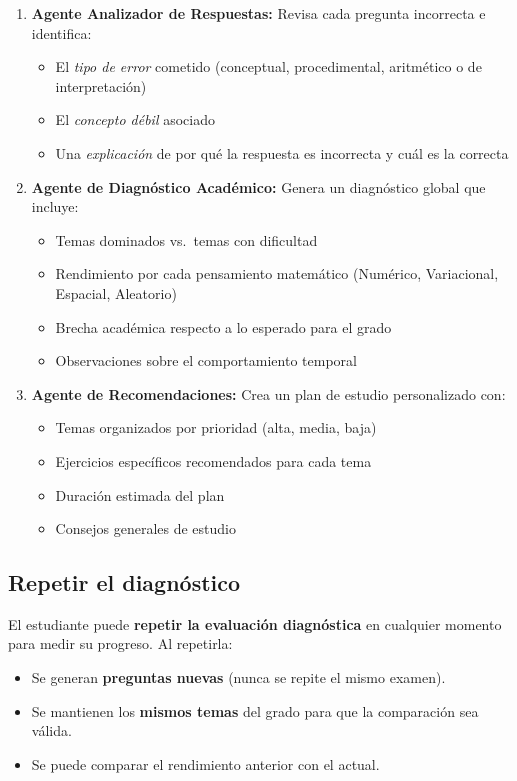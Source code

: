 \documentclass[12pt, a4paper]{article}
\begin{document}
\begin{enumerate}[leftmargin=*, itemsep=8pt]
    \item \textbf{\textcolor{ytOrange}{Agente Analizador de Respuestas:}} Revisa cada pregunta incorrecta e identifica:
    \begin{itemize}
        \item El \textit{tipo de error} cometido (conceptual, procedimental, aritmético o de interpretación)
        \item El \textit{concepto débil} asociado
        \item Una \textit{explicación} de por qué la respuesta es incorrecta y cuál es la correcta
    \end{itemize}
    
    \item \textbf{\textcolor{ytBlue}{Agente de Diagnóstico Académico:}} Genera un diagnóstico global que incluye:
    \begin{itemize}
        \item Temas dominados vs.\ temas con dificultad
        \item Rendimiento por cada pensamiento matemático (Numérico, Variacional, Espacial, Aleatorio)
        \item Brecha académica respecto a lo esperado para el grado
        \item Observaciones sobre el comportamiento temporal
    \end{itemize}
    
    \item \textbf{\textcolor{ytGreen}{Agente de Recomendaciones:}} Crea un plan de estudio personalizado con:
    \begin{itemize}
        \item Temas organizados por prioridad (alta, media, baja)
        \item Ejercicios específicos recomendados para cada tema
        \item Duración estimada del plan
        \item Consejos generales de estudio
    \end{itemize}
\end{enumerate}

\subsection{Repetir el diagnóstico}

El estudiante puede \textbf{repetir la evaluación diagnóstica} en cualquier momento para medir su progreso. Al repetirla:
\begin{itemize}
    \item Se generan \textbf{preguntas nuevas} (nunca se repite el mismo examen).
    \item Se mantienen los \textbf{mismos temas} del grado para que la comparación sea válida.
    \item Se puede comparar el rendimiento anterior con el actual.
\end{itemize}
\end{document}
